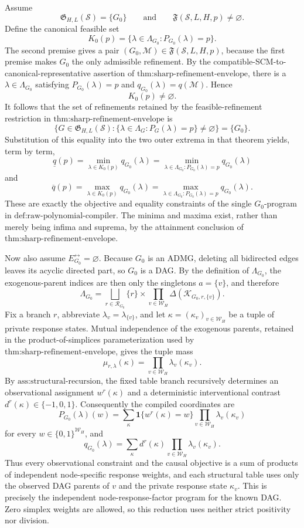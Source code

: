 Assume
\[
\mathfrak G_{H,L}(\mathcal S)=\{G_0\}
\qquad\text{and}\qquad
\mathfrak F(\mathcal S,L,H,p)\ne\varnothing.
\]
Define the canonical feasible set
\[
K_0(p)=\{\lambda\in\Lambda_{G_0}:P_{G_0}(\lambda)=p\}.
\]
The second premise gives a pair \((G_0,\mathcal M)\in\mathfrak F(\mathcal S,L,H,p)\), because the first premise makes \(G_0\) the only admissible refinement.  By the compatible-SCM-to-canonical-representative assertion of \(\text{thm:sharp-refinement-envelope}\), there is a \(\lambda\in\Lambda_{G_0}\) satisfying \(P_{G_0}(\lambda)=p\) and \(q_{G_0}(\lambda)=q(\mathcal M)\).  Hence
\[
K_0(p)\ne\varnothing.
\]
It follows that the set of refinements retained by the feasible-refinement restriction in \(\text{thm:sharp-refinement-envelope}\) is
\[
\bigl\{G\in\mathfrak G_{H,L}(\mathcal S):
\{\lambda\in\Lambda_G:P_G(\lambda)=p\}\ne\varnothing\bigr\}
=\{G_0\}.
\]
Substitution of this equality into the two outer extrema in that theorem yields, term by term,
\[
\underline q(p)
=\min_{\lambda\in K_0(p)}q_{G_0}(\lambda)
=\min_{\lambda\in\Lambda_{G_0}:P_{G_0}(\lambda)=p}q_{G_0}(\lambda)
\]
and
\[
\overline q(p)
=\max_{\lambda\in K_0(p)}q_{G_0}(\lambda)
=\max_{\lambda\in\Lambda_{G_0}:P_{G_0}(\lambda)=p}q_{G_0}(\lambda).
\]
These are exactly the objective and equality constraints of the single \(G_0\)-program in \(\text{def:raw-polynomial-compiler}\).  The minima and maxima exist, rather than merely being infima and suprema, by the attainment conclusion of \(\text{thm:sharp-refinement-envelope}\).

Now also assume \(E_{G_0}^{\leftrightarrow}=\varnothing\).  Because \(G_0\) is an ADMG, deleting all bidirected edges leaves its acyclic directed part, so \(G_0\) is a DAG.  By the definition of \(\Lambda_{G_0}\), the exogenous-parent indices are then only the singletons \(a=\{v\}\), and therefore
\[
\Lambda_{G_0}
=\bigsqcup_{r\in\mathcal R_{G_0}}
\{r\}\times
\prod_{v\in\mathcal W_H}
\Delta(\mathcal K_{G_0,r,\{v\}}).
\]
Fix a branch \(r\), abbreviate \(\lambda_v=\lambda_{\{v\}}\), and let
\(\kappa=(\kappa_v)_{v\in\mathcal W_H}\) be a tuple of private response states.  Mutual independence of the exogenous parents, retained in the product-of-simplices parameterization used by \(\text{thm:sharp-refinement-envelope}\), gives the tuple mass
\[
\mu_{r,\lambda}(\kappa)
=\prod_{v\in\mathcal W_H}\lambda_v(\kappa_v).
\]
By \(\text{ass:structural-recursion}\), the fixed table branch recursively determines an observational assignment \(w^r(\kappa)\) and a deterministic interventional contrast \(d^r(\kappa)\in\{-1,0,1\}\).  Consequently the compiled coordinates are
\[
P_{G_0}(\lambda)(w)
=\sum_{\kappa}
\mathbf 1\{w^r(\kappa)=w\}
\prod_{v\in\mathcal W_H}\lambda_v(\kappa_v)
\]
for every \(w\in\{0,1\}^{\mathcal W_H}\), and
\[
q_{G_0}(\lambda)
=\sum_{\kappa}d^r(\kappa)
\prod_{v\in\mathcal W_H}\lambda_v(\kappa_v).
\]
Thus every observational constraint and the causal objective is a sum of products of independent node-specific response weights, and each structural table uses only the observed DAG parents of \(v\) and the private response state \(\kappa_v\).  This is precisely the independent node-response-factor program for the known DAG.  Zero simplex weights are allowed, so this reduction uses neither strict positivity nor division.

